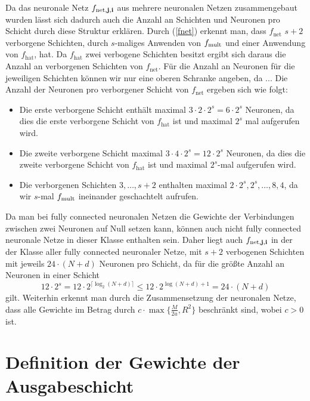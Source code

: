 Da das neuronale Netz $f_{\mathrm{net},\mathbf{j},\mathbf{i}}$ aus mehrere neuronalen Netzen zusammengebaut wurden lässt sich dadurch auch die Anzahl an Schichten und Neuronen pro Schicht durch diese Struktur erklären. Durch (\ref{fnet}) erkennt man, dass $f_{\mathrm{net}}$ $s + 2$ verborgene Schichten, durch $s$-maliges Anwenden von $f_{\mathrm{mult}}$ und einer Anwendung von $f_{\mathrm{hat}}$, hat. Da $f_{\mathrm{hat}}$ zwei verbogene Schichten besitzt ergibt sich daraus die Anzahl an verborgenen Schichten von $f_{\mathrm{net}}$. Für die Anzahl an Neuronen für die jeweiligen Schichten können wir nur eine oberen Schranke angeben, da ... 
Die Anzahl der Neuronen pro verborgener Schicht von $f_{\mathrm{net}}$ ergeben sich wie folgt:
\begin{itemize}
\item Die erste verborgene Schicht enthält maximal $3 \cdot 2 \cdot 2^s = 6 \cdot 2^s$ Neuronen, da dies die erste verborgene Schicht von $f_{\mathrm{hat}}$ ist und maximal $2^s$ mal aufgerufen wird. 
\item Die zweite verborgene Schicht maximal $3 \cdot 4 \cdot 2^s = 12\cdot 2^s$ Neuronen, da dies die zweite verborgene Schicht von $f_{\mathrm{hat}}$ ist und maximal $2^s$-mal aufgerufen wird.
\item Die verborgenen Schichten $3,\dots,s + 2$ enthalten maximal   $2 \cdot 2^s, 2^s, \dots, 8, 4$, da wir $s$-mal $f_{\mathrm{mult}}$ ineinander geschachtelt aufrufen. 
\end{itemize}  
Da man bei fully connected neuronalen Netzen die Gewichte der Verbindungen zwischen zwei Neuronen auf Null setzen kann, können auch nicht fully connected neuronale Netze in dieser Klasse enthalten sein. Daher liegt auch $f_{\mathrm{net},\mathbf{j},\mathbf{i}}$ in der der Klasse aller fully connected neuronaler Netze, mit $s + 2$ verbogenen Schichten mit jeweils $24 \cdot (N + d)$ Neuronen pro Schicht, da für die größte Anzahl an Neuronen in einer Schicht $$12 \cdot 2^s = 12 \cdot 2^{\lceil\log_2(N + d)\rceil} \leq 12 \cdot 2^{\log(N + d) + 1} = 24 \cdot (N + d)$$ gilt. Weiterhin erkennt man durch die Zusammensetzung der neuronalen Netze, dass alle Gewichte im Betrag durch $c \cdot \max\{\frac{M}{2a}, R^2\}$ beschränkt sind, wobei $c > 0$ ist. 

\section{Definition der Gewichte der Ausgabeschicht}


